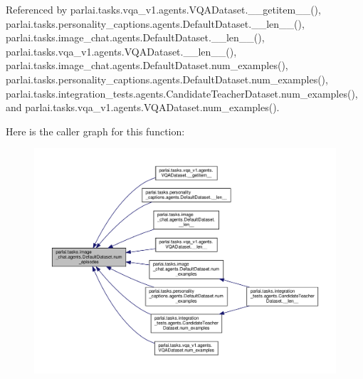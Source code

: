 Referenced by parlai.\+tasks.\+vqa\+\_\+v1.\+agents.\+V\+Q\+A\+Dataset.\+\_\+\+\_\+getitem\+\_\+\+\_\+(), parlai.\+tasks.\+personality\+\_\+captions.\+agents.\+Default\+Dataset.\+\_\+\+\_\+len\+\_\+\+\_\+(), parlai.\+tasks.\+image\+\_\+chat.\+agents.\+Default\+Dataset.\+\_\+\+\_\+len\+\_\+\+\_\+(), parlai.\+tasks.\+vqa\+\_\+v1.\+agents.\+V\+Q\+A\+Dataset.\+\_\+\+\_\+len\+\_\+\+\_\+(), parlai.\+tasks.\+image\+\_\+chat.\+agents.\+Default\+Dataset.\+num\+\_\+examples(), parlai.\+tasks.\+personality\+\_\+captions.\+agents.\+Default\+Dataset.\+num\+\_\+examples(), parlai.\+tasks.\+integration\+\_\+tests.\+agents.\+Candidate\+Teacher\+Dataset.\+num\+\_\+examples(), and parlai.\+tasks.\+vqa\+\_\+v1.\+agents.\+V\+Q\+A\+Dataset.\+num\+\_\+examples().

Here is the caller graph for this function\+:
\nopagebreak
\begin{figure}[H]
\begin{center}
\leavevmode
\includegraphics[width=350pt]{classparlai_1_1tasks_1_1image__chat_1_1agents_1_1DefaultDataset_afd35ea4ecd0e16f58eceb52317da429e_icgraph}
\end{center}
\end{figure}
\mbox{\label{classparlai_1_1tasks_1_1image__chat_1_1agents_1_1DefaultDataset_a50e9a914fa61e0070403b5806a9c392b}} 
